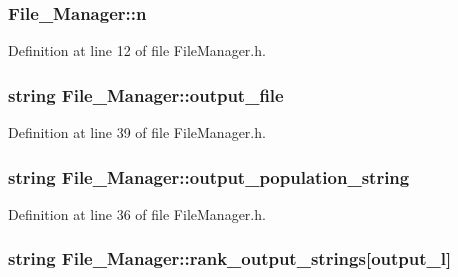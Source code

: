 \hypertarget{a00001_ac70ea2427e95618bb3903b2c57ee9745}{
\subsubsection[{n}]{ File\-\_\-\-Manager\-::n}}\label{d8/d84/a00001_ac70ea2427e95618bb3903b2c57ee9745}


Definition at line 12 of file File\-Manager.\-h.

\hypertarget{a00001_a63725670a06637b4290c54eba671b640}{
\subsubsection[{output\-\_\-file}]{\setlength{\rightskip}{0pt plus 5cm}string File\-\_\-\-Manager\-::output\-\_\-file\hspace{0.3cm}{\ttfamily [private]}}}\label{d8/d84/a00001_a63725670a06637b4290c54eba671b640}


Definition at line 39 of file File\-Manager.\-h.

\hypertarget{a00001_a4266a9bec2fff5d17d7abf06e00384db}{
\subsubsection[{output\-\_\-population\-\_\-string}]{\setlength{\rightskip}{0pt plus 5cm}string File\-\_\-\-Manager\-::output\-\_\-population\-\_\-string\hspace{0.3cm}{\ttfamily [private]}}}\label{d8/d84/a00001_a4266a9bec2fff5d17d7abf06e00384db}


Definition at line 36 of file File\-Manager.\-h.

\hypertarget{a00001_a578abb99a35121fea6c83f1dc21cc2af}{
\subsubsection[{rank\-\_\-output\-\_\-strings}]{\setlength{\rightskip}{0pt plus 5cm}string File\-\_\-\-Manager\-::rank\-\_\-output\-\_\-strings\mbox{[}{\bf output\-\_\-l}\mbox{]}\hspace{0.3cm}{\ttfamily [private]}}}\label{d8/d84/a00001_a578abb99a35121fea6c83f1dc21cc2af}


